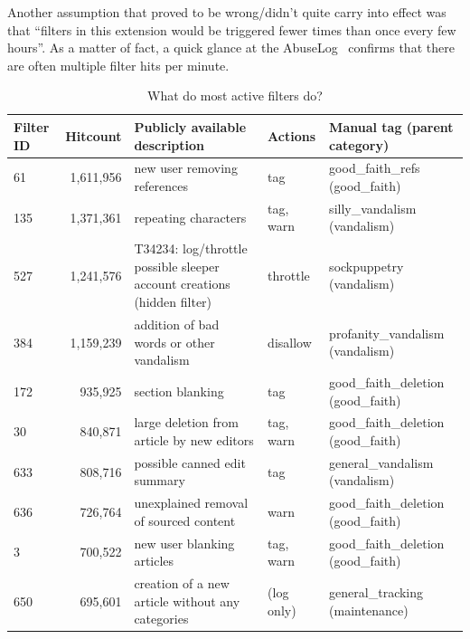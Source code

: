 Another assumption that proved to be wrong/didn't quite carry into effect was that ``filters in this extension would be triggered fewer times than once every few hours''.
As a matter of fact, a quick glance at the AbuseLog~\cite{Wikipedia:AbuseLog} confirms that there are often multiple filter hits per minute.

\begin{table}[t]
  \centering
    \begin{tabular}{p{1cm} r p{5cm} p{2cm} p{3cm}}
        Filter ID & Hitcount & Publicly available description & Actions & Manual tag (parent category) \\
    \hline
        61 & 1,611,956 & new user removing references & tag & good\_faith\_refs (good\_faith) \\
        135 & 1,371,361 & repeating characters & tag, warn & silly\_vandalism (vandalism)\\
        527 & 1,241,576 & T34234: log/throttle possible sleeper account creations (hidden filter) & throttle & sockpuppetry (vandalism) \\
        384 & 1,159,239 & addition of bad words or other vandalism & disallow & profanity\_vandalism (vandalism) \\
        172 & 935,925 & section blanking & tag & good\_faith\_deletion (good\_faith) \\
        30 & 840,871 & large deletion from article by new editors & tag, warn & good\_faith\_deletion (good\_faith) \\
        633 & 808,716 & possible canned edit summary & tag & general\_vandalism (vandalism) \\
        636 & 726,764 & unexplained removal of sourced content & warn & good\_faith\_deletion (good\_faith) \\
        3 & 700,522 & new user blanking articles & tag, warn & good\_faith\_deletion (good\_faith) \\
        650 & 695,601 & creation of a new article without any categories & (log only) & general\_tracking (maintenance) \\
  \end{tabular}
  \caption{What do most active filters do?}~\label{tab:most-active-actions}
\end{table}

